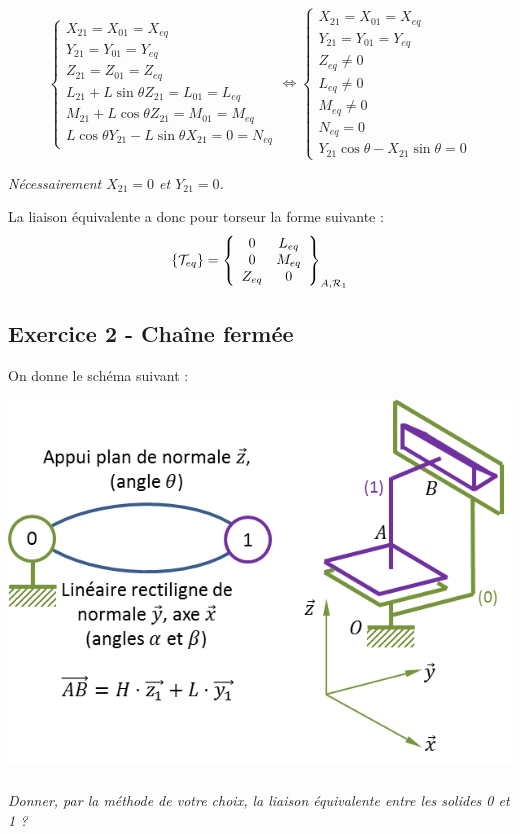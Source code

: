 \documentclass[10pt]{article}
\begin{document}
{\begin{corrige}
$$
\left\{
\begin{array}{l}
X_{21}=X_{01}=X_{eq}\\
Y_{21}=Y_{01}=Y_{eq}\\
Z_{21}=Z_{01}=Z_{eq}\\
L_{21}+L\sin\theta Z_{21}=L_{01}=L_{eq}\\
M_{21}+L\cos\theta Z_{21}=M_{01}=M_{eq}\\
L\cos\theta Y_{21}-L\sin\theta X_{21}=0=N_{eq}
\end{array}
\right.
\Longleftrightarrow
\left\{
\begin{array}{l}
X_{21}=X_{01}=X_{eq}\\
Y_{21}=Y_{01}=Y_{eq}\\
Z_{eq}\neq 0\\
L_{eq}\neq 0\\
M_{eq}\neq 0\\
N_{eq}=0 \\
Y_{21}\cos\theta- X_{21}\sin\theta=0
\end{array}
\right.
$$


\textit{Nécessairement $X_{21}=0$ et $Y_{21}=0$.}

La liaison équivalente a donc pour torseur la forme suivante :
$$
\{\mathcal{T}_{eq}\}=
\torseurcol{0}{0}{Z_{eq}}{L_{eq}}{M_{eq}}{0}{A,\mathcal{R}_1}
$$
\end{corrige}
}{}



\subsection*{Exercice 2 - Chaîne fermée}
On donne le schéma suivant : 

\begin{center}
\includegraphics[width=.6\textwidth]{images/cf}
\end{center}

\subparagraph*{}
\textit{Donner, par la méthode de votre choix, la liaison équivalente entre les solides 0 et 1 ?}
\end{document}
